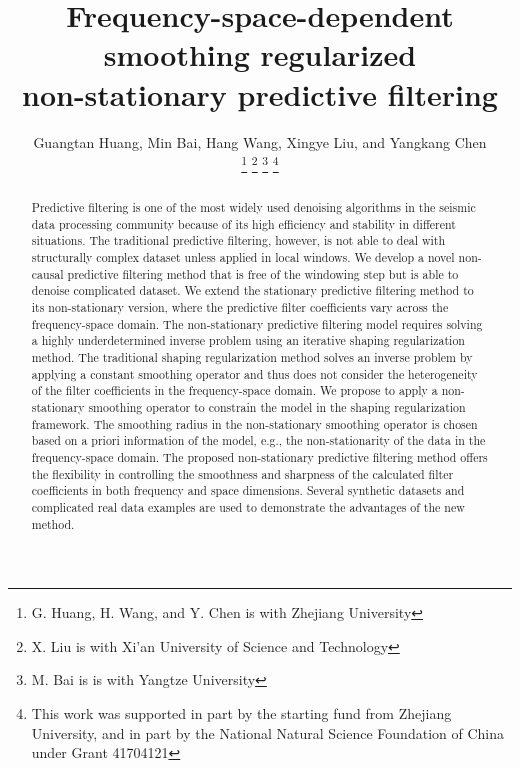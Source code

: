 \title{Frequency-space-dependent smoothing regularized \\
non-stationary predictive filtering}
\renewcommand{\thefootnote}{\fnsymbol{footnote}}
\author{Guangtan Huang, Min Bai, Hang Wang, Xingye Liu, and Yangkang Chen

\thanks{G. Huang, H. Wang, and Y. Chen is with Zhejiang University}
\thanks{X. Liu is with Xi’an University of Science and Technology}
\thanks{M. Bai is is with Yangtze University}
\thanks{This work was supported in part by the starting fund from Zhejiang University, and in part by the National Natural Science Foundation of China under Grant 41704121}}
\maketitle

\begin{abstract}
Predictive filtering is one of the most widely used denoising algorithms in the seismic data processing community because of its high efficiency and stability in different situations. The traditional predictive filtering, however, is not able to deal with structurally complex dataset unless applied in local windows. We develop a novel non-causal predictive filtering method that is free of the windowing step but is able to denoise complicated dataset. We extend the stationary predictive filtering method to its non-stationary version, where the predictive filter coefficients vary across the frequency-space domain. The non-stationary predictive filtering model requires solving a highly underdetermined inverse problem using an iterative shaping regularization method. The traditional shaping regularization method solves an inverse problem by applying a constant smoothing operator and thus does not consider the heterogeneity of the filter coefficients in the frequency-space domain. We propose to apply a non-stationary smoothing operator to constrain the model in the shaping regularization framework. The smoothing radius in the non-stationary smoothing operator is chosen based on a priori information of the model, e.g., the non-stationarity of the data in the frequency-space domain. The proposed non-stationary predictive filtering method offers the flexibility in controlling the smoothness and sharpness of the calculated filter coefficients in both frequency and space dimensions. Several synthetic datasets and complicated real data examples are used to demonstrate the advantages of the new method.
\end{abstract}

